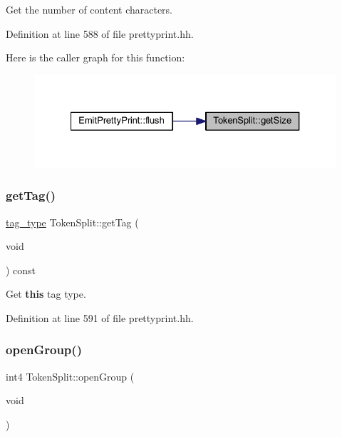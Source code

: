 Get the number of content characters. 



Definition at line 588 of file prettyprint.\+hh.

Here is the caller graph for this function\+:
\nopagebreak
\begin{figure}[H]
\begin{center}
\leavevmode
\includegraphics[width=327pt]{class_token_split_acf9542eb5fe9653255b5277cc63c1e6a_icgraph}
\end{center}
\end{figure}
\mbox{\label{class_token_split_a2a88b73a7807210f6e1afd42c09f6a7f}} 
\subsubsection{\texorpdfstring{getTag()}{getTag()}}
{\footnotesize\ttfamily \mbox{\hyperlink{class_token_split_aeb8df0fee5549b7698495e5b408acc77}{tag\+\_\+type}} Token\+Split\+::get\+Tag (\begin{DoxyParamCaption}\item[{void}]{ }\end{DoxyParamCaption}) const\hspace{0.3cm}{\ttfamily [inline]}}



Get {\bfseries{this}} tag type. 



Definition at line 591 of file prettyprint.\+hh.

\mbox{\label{class_token_split_a467d591af196f9a606dd50586775f7d4}} 
\subsubsection{\texorpdfstring{openGroup()}{openGroup()}}
{\footnotesize\ttfamily int4 Token\+Split\+::open\+Group (\begin{DoxyParamCaption}\item[{void}]{ }\end{DoxyParamCaption})\hspace{0.3cm}{\ttfamily [inline]}}



